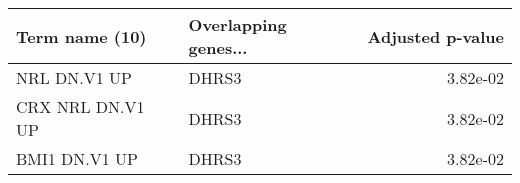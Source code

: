 \begin{tabular}{llr}
\toprule
  Term name (10) & Overlapping genes... &  Adjusted p-value \\
\midrule
    NRL DN.V1 UP &                DHRS3 &          3.82e-02 \\
CRX NRL DN.V1 UP &                DHRS3 &          3.82e-02 \\
   BMI1 DN.V1 UP &                DHRS3 &          3.82e-02 \\
\bottomrule
\end{tabular}
